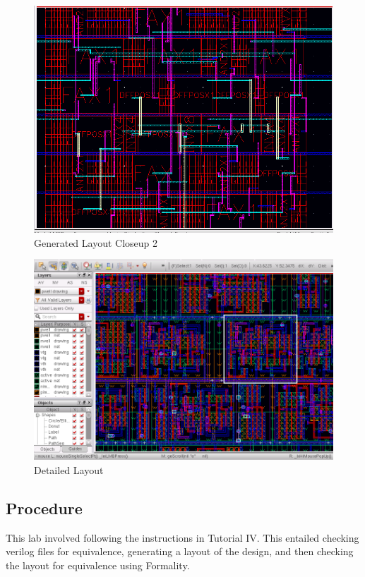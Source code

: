 \documentclass[12pt]{article}
\begin{document}
\begin{figure}[H]
\centering
\includegraphics[width=1\linewidth]{layout-3}
\caption{Generated Layout Closeup 2}
\label{fig:layout-3}
\end{figure}

\begin{figure}[H]
\centering
\includegraphics[width=1\linewidth]{layout-4}
\caption{Detailed Layout}
\label{fig:layout-4}
\end{figure}


\subsection{Procedure}
This lab involved following the instructions in Tutorial IV. This entailed checking verilog files for equivalence, generating a layout of the design, and then checking the layout for equivalence using Formality.
\end{document}
